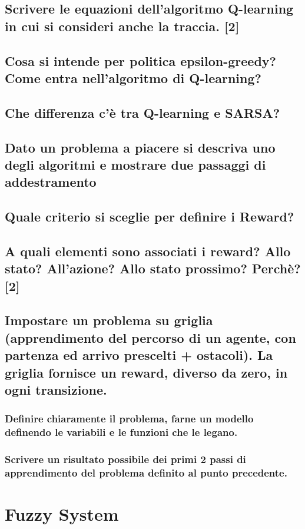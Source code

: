 \documentclass[\main/main.tex]{subfiles}
\begin{document}
\subsection{Scrivere le equazioni dell'algoritmo Q-learning in cui si consideri anche la traccia. [2]}
\subsection{Cosa si intende per politica epsilon-greedy? Come entra nell’algoritmo di Q-learning? }
\subsection{Che differenza c’è tra Q-learning e SARSA?}
\subsection{Dato un problema a piacere si descriva uno degli algoritmi e mostrare due passaggi di addestramento}
\subsection{Quale criterio si sceglie per definire i Reward?}
\subsection{A quali elementi sono associati i reward? Allo stato? All'azione? Allo stato prossimo? Perchè? [2]}
\subsection{Impostare un problema su griglia (apprendimento del percorso di un agente, con partenza ed arrivo prescelti + ostacoli). La griglia fornisce un reward, diverso da zero, in ogni transizione.}
\subsubsection{Definire chiaramente il problema, farne un modello definendo le variabili e le funzioni che le legano.}
\subsubsection{Scrivere un risultato possibile dei primi 2 passi di apprendimento del problema definito al punto precedente.}

\section{Fuzzy System}
\end{document}
